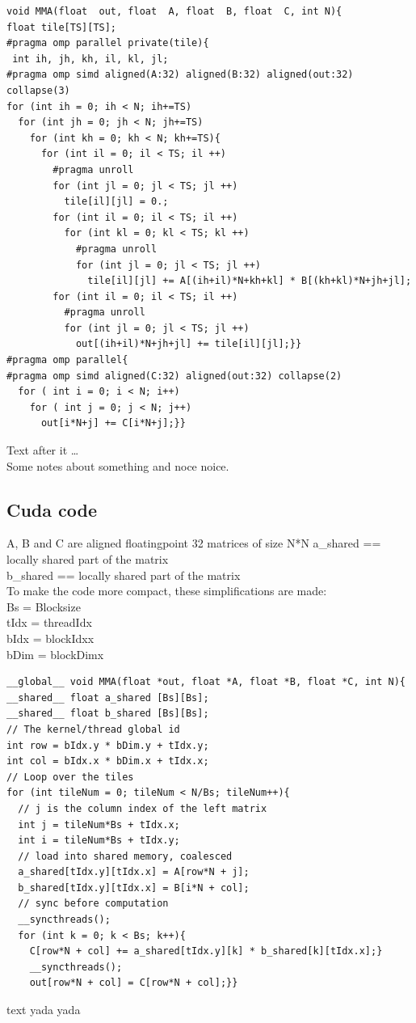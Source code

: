 \documentclass[conference]{IEEEtran}
\begin{document}
  \begin{lstlisting}
void MMA(float  out, float  A, float  B, float  C, int N){
float tile[TS][TS];
#pragma omp parallel private(tile){
 int ih, jh, kh, il, kl, jl;
#pragma omp simd aligned(A:32) aligned(B:32) aligned(out:32) collapse(3) 
for (int ih = 0; ih < N; ih+=TS)
  for (int jh = 0; jh < N; jh+=TS)
    for (int kh = 0; kh < N; kh+=TS){
      for (int il = 0; il < TS; il ++)
        #pragma unroll
        for (int jl = 0; jl < TS; jl ++)
          tile[il][jl] = 0.;
        for (int il = 0; il < TS; il ++)
          for (int kl = 0; kl < TS; kl ++)
            #pragma unroll
            for (int jl = 0; jl < TS; jl ++)
              tile[il][jl] += A[(ih+il)*N+kh+kl] * B[(kh+kl)*N+jh+jl];
        for (int il = 0; il < TS; il ++)
          #pragma unroll
          for (int jl = 0; jl < TS; jl ++)
            out[(ih+il)*N+jh+jl] += tile[il][jl];}}
#pragma omp parallel{
#pragma omp simd aligned(C:32) aligned(out:32) collapse(2)
  for ( int i = 0; i < N; i++)
    for ( int j = 0; j < N; j++)
      out[i*N+j] += C[i*N+j];}}
  \end{lstlisting}
  Text after it \dots \\
  Some notes about something and noce noice.

  \subsection{Cuda code}\label{sec:CudaCode}

  A, B and C are aligned floatingpoint 32 matrices of size N*N
  a\_shared == locally shared part of the matrix \\
  b\_shared == locally shared part of the matrix \\
  To make the code more compact, these simplifications are made:\\
  Bs = Blocksize \\
  tIdx = threadIdx \\
  bIdx = blockIdxx \\
  bDim = blockDimx
  \begin{lstlisting}
__global__ void MMA(float *out, float *A, float *B, float *C, int N){
__shared__ float a_shared [Bs][Bs];
__shared__ float b_shared [Bs][Bs];
// The kernel/thread global id
int row = bIdx.y * bDim.y + tIdx.y;
int col = bIdx.x * bDim.x + tIdx.x;
// Loop over the tiles
for (int tileNum = 0; tileNum < N/Bs; tileNum++){   
  // j is the column index of the left matrix
  int j = tileNum*Bs + tIdx.x;
  int i = tileNum*Bs + tIdx.y;
  // load into shared memory, coalesced
  a_shared[tIdx.y][tIdx.x] = A[row*N + j];
  b_shared[tIdx.y][tIdx.x] = B[i*N + col];
  // sync before computation
  __syncthreads();
  for (int k = 0; k < Bs; k++){
    C[row*N + col] += a_shared[tIdx.y][k] * b_shared[k][tIdx.x];}
    __syncthreads();
    out[row*N + col] = C[row*N + col];}}   
  \end{lstlisting}
  text yada yada
  
\end{document}
